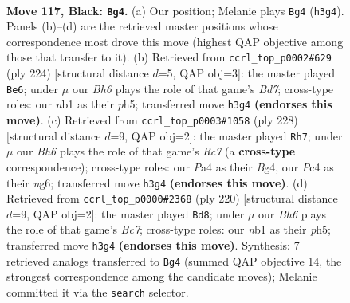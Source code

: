 \documentclass[11pt]{article}
\begin{document}
\clearpage

\begin{figure}[p]\centering
\begin{subfigure}{0.46\textwidth}\centering
\resizebox{\linewidth}{!}{%
\newchessgame
\chessboard[
  setfen={8/8/1B3k2/8/p1p5/7b/5K2/1N6 b - - 89 117},
  showmover=false,
  pgfstyle=straightmove, color=movearrow, markmove={h3-g4}
]}
\caption{}
\end{subfigure}\hfill
\begin{subfigure}{0.46\textwidth}\centering
\resizebox{\linewidth}{!}{%
\newchessgame
\chessboard[
  setfen={1b6/1P1B4/8/7p/5k1P/8/8/5K2 w - - 13 113},
  showmover=false,
  pgfstyle=straightmove, color=movearrow, markmove={d7-e6}
]}
\caption{}
\end{subfigure}
\\[4pt]
\begin{subfigure}{0.46\textwidth}\centering
\resizebox{\linewidth}{!}{%
\newchessgame
\chessboard[
  setfen={8/2R5/5bn1/3K4/6B1/8/1k6/8 w - - 69 115},
  showmover=false,
  pgfstyle=straightmove, color=movearrow, markmove={c7-h7}
]}
\caption{}
\end{subfigure}\hfill
\begin{subfigure}{0.46\textwidth}\centering
\resizebox{\linewidth}{!}{%
\newchessgame
\chessboard[
  setfen={8/2Bb4/p7/5k1p/7P/K7/8/8 w - - 50 111},
  showmover=false,
  pgfstyle=straightmove, color=movearrow, markmove={c7-d8}
]}
\caption{}
\end{subfigure}
\caption{\textbf{Move 117, Black: \texttt{Bg4}.} (a) Our position; Melanie plays \texttt{Bg4} (\texttt{h3g4}). Panels (b)--(d) are the retrieved master positions whose correspondence most drove this move (highest QAP objective among those that transfer to it). (b) Retrieved from \texttt{ccrl\_top\_p0002\#629} (ply 224) [structural distance $d$=5, QAP obj=3]: the master played \texttt{Be6}; under $\mu$ our \emph{Bh6} plays the role of that game's \emph{Bd7}; cross-type roles: our \emph{n}b1 as their \emph{p}h5; transferred move \texttt{h3g4} \textbf{(endorses this move)}. (c) Retrieved from \texttt{ccrl\_top\_p0003\#1058} (ply 228) [structural distance $d$=9, QAP obj=2]: the master played \texttt{Rh7}; under $\mu$ our \emph{Bh6} plays the role of that game's \emph{Rc7} (a \textbf{cross-type} correspondence); cross-type roles: our \emph{P}a4 as their \emph{B}g4, our \emph{P}c4 as their \emph{n}g6; transferred move \texttt{h3g4} \textbf{(endorses this move)}. (d) Retrieved from \texttt{ccrl\_top\_p0000\#2368} (ply 220) [structural distance $d$=9, QAP obj=2]: the master played \texttt{Bd8}; under $\mu$ our \emph{Bh6} plays the role of that game's \emph{Bc7}; cross-type roles: our \emph{n}b1 as their \emph{p}h5; transferred move \texttt{h3g4} \textbf{(endorses this move)}. Synthesis: 7 retrieved analogs transferred to \texttt{Bg4} (summed QAP objective 14, the strongest correspondence among the candidate moves); Melanie committed it via the \texttt{search} selector.}
\label{fig:thought-m233}
\end{figure}
\end{document}
